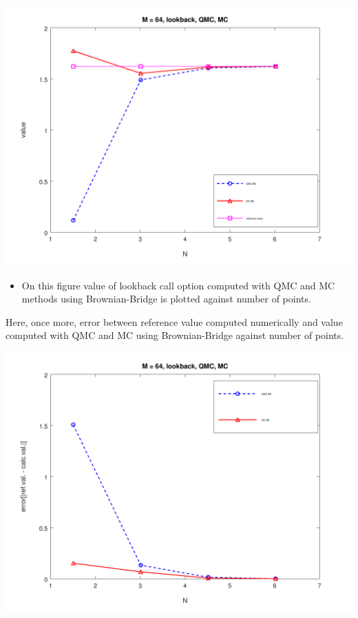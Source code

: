 \documentclass[10pt,a4paper]{article}
\begin{document}
\begin{center}
	\includegraphics[scale=0.35]{images/task6.png}
\end{center}
\begin{itemize}
    \item{
        On this figure value of lookback call option computed with QMC and MC methods using Brownian-Bridge is plotted against number of points.
        
    }
     
\end{itemize}
Here, once more, error between reference value computed numerically and value computed with QMC and MC using Brownian-Bridge against number of points.
\begin{center}
	\includegraphics[scale=0.35]{images/task6_error.png}
\end{center}
\end{document}
